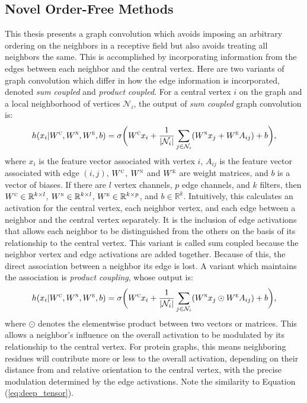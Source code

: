 \subsection{Novel Order-Free Methods}
This thesis presents a graph convolution which avoids imposing an arbitrary ordering on the neighbors in a receptive field but also avoids treating all neighbors the same.
This is accomplished by incorporating information from the edges between each neighbor and the central vertex.
Here are two variants of graph convolution which differ in how the edge information is incorporated, denoted \textit{sum coupled} and \textit{product coupled}.
For a central vertex $i$ on the graph and a local neighborhood of vertices $\mathcal{N}_i$, the output of \emph{sum coupled} graph convolution is:
\begin{equation}
h(x_i | W^\textsc{c}, W^\textsc{n}, W^\textsc{e}, b) = \sigma \bigg( W^{\textsc{c}} x_i + \frac{1}{|\mathcal{N}_i|}\sum_{j \in \mathcal{N}_i} (W^{\textsc{n}} x_j + W^{\textsc{e}} A_{ij}) + b \bigg),
\label{eq:sum_coupling}
\end{equation}
where $x_i$ is the feature vector associated with vertex $i$, $A_{ij}$ is the feature vector associated with edge $(i, j)$, $W^\textsc{c}$, $W^\textsc{n}$ and $W^\textsc{e}$ are weight matrices, and $b$ is a vector of biases. 
If there are $l$ vertex channels, $p$ edge channels, and $k$ filters, then $W^\textsc{c}\in\mathbb{R}^{k \times l}$, $W^\textsc{n}\in\mathbb{R}^{k \times l}$, $W^\textsc{e}\in\mathbb{R}^{k \times p}$, and $b\in\mathbb{R}^{k}$.
Intuitively, this calculates an activation for the central vertex, each neighbor vertex, and each edge between a neighbor and the central vertex separately.
It is the inclusion of edge activations that allows each neighbor to be distinguished from the others on the basis of its relationship to the central vertex.
This variant is called sum coupled because the neighbor vertex and edge activations are added together.
Because of this, the direct association between a neighbor its edge is lost.
A variant which maintains the association is \emph{product coupling}, whose output is:
\begin{equation}
h(x_i | W^\textsc{c}, W^\textsc{n}, W^\textsc{e}, b) = \sigma \bigg( W^{\textsc{c}} x_i + \frac{1}{|\mathcal{N}_i|}\sum_{j \in \mathcal{N}_i} (W^{\textsc{n}} x_j \odot W^{\textsc{e}} A_{ij}) + b \bigg),
\label{eq:prod_coupling}
\end{equation}
where $\odot$ denotes the elementwise product between two vectors or matrices. 
This allows a neighbor's influence on the overall activation to be modulated by its relationship to the central vertex.
For protein graphs, this means neighboring residues will contribute more or less to the overall activation, depending on their distance from and relative orientation to the central vertex, with the precise modulation determined by the edge activations.
Note the similarity to Equation (\ref{eq:deep_tensor}).

